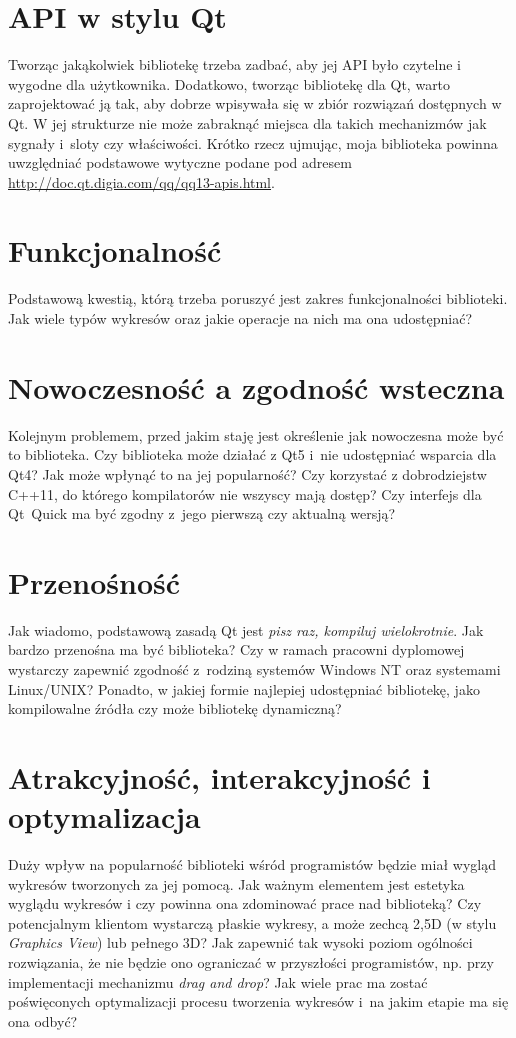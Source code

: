 \documentclass[11pt,twoside,a4paper,final]{llncs}
\begin{document}
\section{API w stylu Qt}
Tworząc jakąkolwiek bibliotekę trzeba zadbać, aby jej API było czytelne i wygodne dla użytkownika. Dodatkowo, tworząc bibliotekę dla Qt, warto zaprojektować ją tak, aby dobrze wpisywała się w zbiór rozwiązań dostępnych w Qt. W jej strukturze nie może zabraknąć miejsca dla takich mechanizmów jak sygnały i~sloty czy właściwości. Krótko rzecz ujmując, moja biblioteka powinna uwzględniać podstawowe wytyczne podane pod adresem \url{http://doc.qt.digia.com/qq/qq13-apis.html}.

\section{Funkcjonalność}
Podstawową kwestią, którą trzeba poruszyć jest zakres funkcjonalności biblioteki. Jak wiele typów wykresów oraz jakie operacje na nich ma ona udostępniać?

\section{Nowoczesność a zgodność wsteczna}
Kolejnym problemem, przed jakim staję jest określenie jak nowoczesna może być to biblioteka. Czy biblioteka może działać z Qt5 i~nie udostępniać wsparcia dla Qt4? Jak może wpłynąć to na jej popularność? Czy korzystać z dobrodziejstw C++11, do którego kompilatorów nie wszyscy mają dostęp? Czy interfejs dla Qt~Quick ma być zgodny z~jego pierwszą czy aktualną wersją?

\section{Przenośność}
Jak wiadomo, podstawową zasadą Qt jest \textit{pisz raz, kompiluj wielokrotnie}. Jak bardzo przenośna ma być biblioteka? Czy w ramach pracowni dyplomowej wystarczy zapewnić zgodność z~rodziną systemów Windows NT oraz systemami Linux/UNIX? Ponadto, w jakiej formie najlepiej udostępniać bibliotekę, jako kompilowalne źródła czy może bibliotekę dynamiczną?

\section{Atrakcyjność, interakcyjność i optymalizacja}
Duży wpływ na popularność biblioteki wśród programistów będzie miał wygląd wykresów tworzonych za jej pomocą. Jak ważnym elementem jest estetyka wyglądu wykresów i czy powinna ona zdominować prace nad biblioteką? Czy potencjalnym klientom wystarczą płaskie wykresy, a może zechcą 2,5D (w stylu \textit{Graphics View}) lub pełnego 3D? Jak zapewnić tak wysoki poziom ogólności rozwiązania, że nie będzie ono ograniczać w przyszłości programistów, np. przy implementacji mechanizmu \textit{drag and drop}?
Jak wiele prac ma zostać poświęconych optymalizacji procesu tworzenia wykresów i~na jakim etapie ma się ona odbyć?
\end{document}

